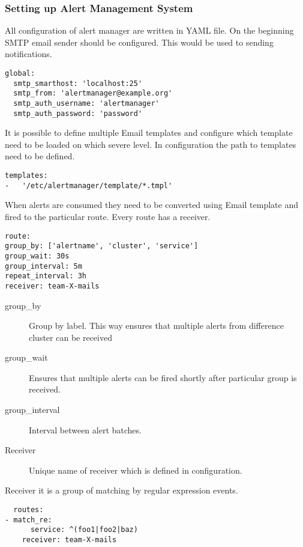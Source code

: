 \subsubsection{Setting up Alert Management System}\label{Setting up Alert Management System}

All configuration of alert manager are written in YAML file. 
On the beginning SMTP email sender should be configured. This would be used to sending notifications.

 \begin{lstlisting}
global:
  smtp_smarthost: 'localhost:25'
  smtp_from: 'alertmanager@example.org'
  smtp_auth_username: 'alertmanager'
  smtp_auth_password: 'password'
\end{lstlisting}

It is possible to define multiple Email templates and configure which template need to be loaded on which severe level. In configuration the path to templates need to be defined. 

 \begin{lstlisting}
templates: 
-	'/etc/alertmanager/template/*.tmpl'
\end{lstlisting}

When alerts are consumed they need to be converted using Email template and fired to the particular route. Every route has a receiver. 

 \begin{lstlisting}
route:
group_by: ['alertname', 'cluster', 'service']
group_wait: 30s
group_interval: 5m
repeat_interval: 3h 
receiver: team-X-mails
\end{lstlisting}

\begin{description}
\item[group\_by] Group by label. This way ensures that multiple alerts from difference cluster can be received
\item[group\_wait] Ensures that multiple alerts can be fired shortly after particular group is received.
\item[group\_interval] Interval between alert batches.
\item[Receiver] Unique name of receiver which is defined in configuration. 
\end{description}

Receiver it is a group of matching by regular expression events.

 \begin{lstlisting}
  routes:
- match_re:
      service: ^(foo1|foo2|baz)
    receiver: team-X-mails
\end{lstlisting}

